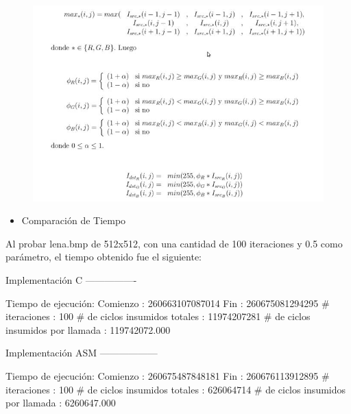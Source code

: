 \documentclass[10pt, a4paper]{article}
\begin{document}
\begin{itemize}
\begin{figure}[H] %
\begin{center}
\includegraphics[width=400pt]{./colorizar.jpg}
\end{center}
\end{figure}

\begin{itemize}
\item{Comparación de Tiempo}
\end{itemize}
Al probar lena.bmp de 512x512, con una cantidad de 100 iteraciones y 0.5 como parámetro, el tiempo obtenido fue el siguiente:\newline

Implementación C\newline
----------------

Tiempo de ejecución:\newline
  Comienzo                          : 260663107087014\newline
  Fin                               : 260675081294295\newline
  \# iteraciones                     : 100\newline
  \# de ciclos insumidos totales     : 11974207281\newline
  \# de ciclos insumidos por llamada : 119742072.000\newline

Implementación ASM\newline
------------------

Tiempo de ejecución:\newline
  Comienzo                          : 260675487848181\newline
  Fin                               : 260676113912895\newline
  \# iteraciones                     : 100\newline
  \# de ciclos insumidos totales     : 626064714\newline
  \# de ciclos insumidos por llamada : 6260647.000\newline


\end{itemize}
\end{document}
